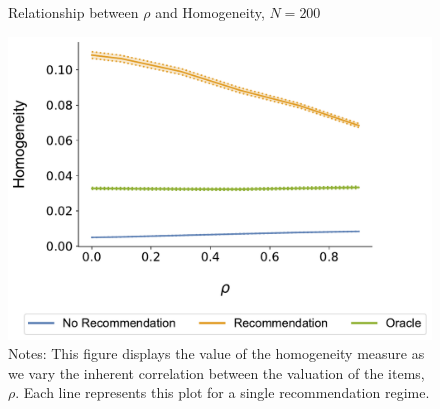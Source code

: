 \documentclass[format=acmsmall, review=true]{acmart}
\begin{document}
\addtocounter{figure}{-1}

\begin{figure}[ht]
\caption{Relationship between $\rho$ and Homogeneity, $N = 200$}
\includegraphics[width=.45\linewidth]{figures/rho_homogeneity_N_200_T_20}
\caption*{\scriptsize Notes: This figure displays the value of the homogeneity measure as we vary the inherent correlation between the valuation of the items, $\rho$. Each line represents this plot for a single recommendation regime.}\label{fig:cor_homo}
\end{figure}
\end{document}

